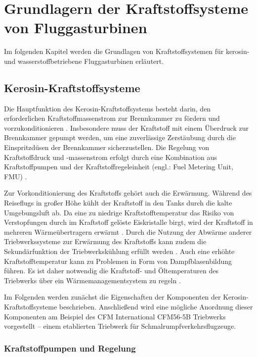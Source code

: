 \chapter{Grundlagern der Kraftstoffsysteme von Fluggasturbinen}\label{chap:grundlagen}

Im folgenden Kapitel werden die Grundlagen von Kraftstoffsystemen für kerosin- und wasserstoffbetriebene Fluggasturbinen erläutert.

\section{Kerosin-Kraftstoffsysteme}

Die Hauptfunktion des Kerosin-Kraftstoffsystems besteht darin, den erforderlichen Kraftstoffmassenstrom zur Brennkammer zu fördern und vorzukonditionieren \cite{Jackson.2015}. Insbesondere muss der Kraftstoff mit einem Überdruck zur Brennkammer gepumpt werden, um eine zuverlässige Zerstäubung durch die Einspritzdüsen der Brennkammer sicherzustellen. Die Regelung von Kraftstoffdruck und  -massenstrom erfolgt durch eine Kombination aus Kraftstoffpumpen und der Kraftstoffregeleinheit (engl.: Fuel Metering Unit, FMU) \cite{Braunling.2015}. 

Zur Vorkonditionierung des Kraftstoffs gehört auch die Erwärmung. Während des Reiseflugs in großer Höhe kühlt der Kraftstoff in den Tanks durch die kalte Umgebungsluft ab. Da eine zu niedrige Kraftstofftemperatur das Risiko von Verstopfungen durch im Kraftstoff gelöste Eiskristalle birgt, wird der Kraftstoff in mehreren Wärmeübertragern erwärmt \cite{Doman.2015}. Durch die Nutzung der Abwärme anderer Triebwerkssysteme zur Erwärmung des Kraftstoffs kann zudem die Sekundärfunktion der Triebwerkskühlung erfüllt werden \cite{Braunling.2015, Jackson.2015}. Auch eine erhöhte Kraftstofftemperatur kann zu Problemen in Form von Dampfblasenbildung führen. Es ist daher notwendig die Kraftstoff- und Öltemperaturen des Triebwerks über ein Wärmemanagementsystem zu regeln \cite{Braunling.2015}. 

Im Folgenden werden zunächst die Eigenschaften der Komponenten der Kerosin-Kraftstoffsysteme beschrieben. Anschließend wird eine mögliche Anordnung dieser Komponenten am Beispiel des CFM International CFM56-5B Triebwerks vorgestellt – einem etablierten Triebwerk für Schmalrumpfverkehrsflugzeuge.

\subsection{Kraftstoffpumpen und Regelung}

